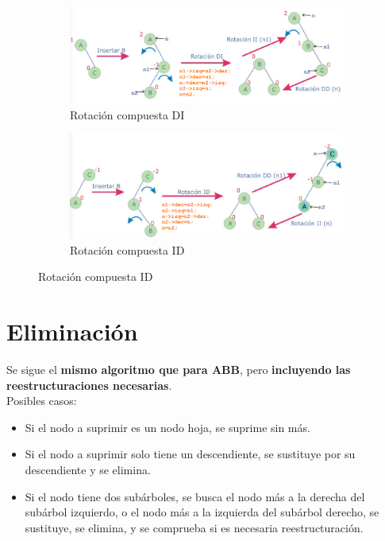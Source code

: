 \documentclass{article}
\begin{document}
\begin{figure}[h]
    \centering
    \begin{subfigure}{0.65\textwidth}
        \centering
        \includegraphics[width=\linewidth]{img-t4/img_591_40.png}
        \caption{Rotación compuesta DI}
        \label{fig:imagen1}
    \end{subfigure}
    \hfill
    \begin{subfigure}{0.65\textwidth}
        \centering
        \includegraphics[width=\linewidth]{img-t4/img_376_78.png}
        \caption{Rotación compuesta ID}
        \label{fig:imagen2}
    \end{subfigure}
    \label{fig:imagenes}
\end{figure}

\newpage

\section{Eliminación}
Se sigue el \textbf{mismo algoritmo que para ABB}, pero \textbf{incluyendo las reestructuraciones necesarias}. \\
Posibles casos:
\begin{itemize}
    \item Si el nodo a suprimir es un nodo hoja, se suprime sin más.
    \item Si el nodo a suprimir solo tiene un descendiente, se sustituye por su descendiente y se elimina.
    \item Si el nodo tiene dos subárboles, se busca el nodo más a la derecha del subárbol izquierdo, o el nodo más a la izquierda del subárbol derecho, se sustituye, se elimina, y se comprueba si es necesaria reestructuración.
\end{itemize}
\end{document}

